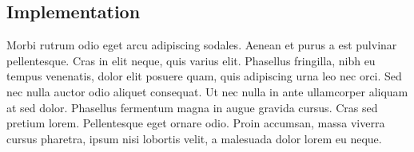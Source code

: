 
\subsection{Implementation}
Morbi rutrum odio eget arcu adipiscing sodales. Aenean et purus a est pulvinar pellentesque. Cras in elit neque, quis varius elit. Phasellus fringilla, nibh eu tempus venenatis, dolor elit posuere quam, quis adipiscing urna leo nec orci. Sed nec nulla auctor odio aliquet consequat. Ut nec nulla in ante ullamcorper aliquam at sed dolor. Phasellus fermentum magna in augue gravida cursus. Cras sed pretium lorem. Pellentesque eget ornare odio. Proin accumsan, massa viverra cursus pharetra, ipsum nisi lobortis velit, a malesuada dolor lorem eu neque.
